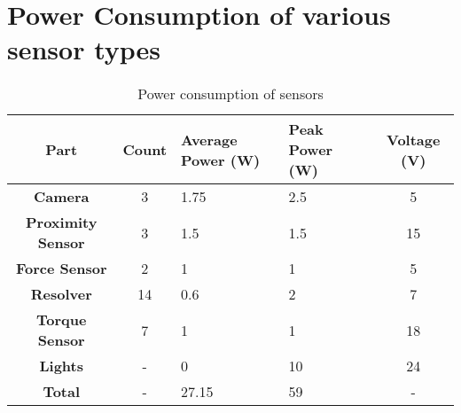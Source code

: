 \newpage
\section{Power Consumption of various sensor types}
\label{app:sensorpower}
\begin{table}[H]
\centering
\caption{Power consumption of sensors}
\begin{tabular}{ccC{3cm}C{3cm}c}
\toprule
\textbf{Part}	&	\textbf{Count}	&	\textbf{Average Power (W)}	&	\textbf{Peak Power (W)}	&	\textbf{Voltage (V)}	\\\midrule
\textbf{Camera}	&	
3	&	1.75	&	2.5	&	5	\\
\textbf{Proximity Sensor}	&	
3	&	1.5	&	1.5	&	15	\\
\textbf{Force Sensor}	&	
2	&	1	&	1	&	5	\\
\textbf{Resolver}	&	
14	&	0.6	&	2	&	7	\\
\textbf{Torque Sensor}	&	
7	&	1	&	1	&	18	\\
\textbf{Lights}	&	
-	&	0	&	10	&	24	\\
\hline
\textbf{Total}	&	
-	&	27.15	&	59	&	-	\\\bottomrule
\end{tabular}
\label{tab:sensorpower}
\end{table}